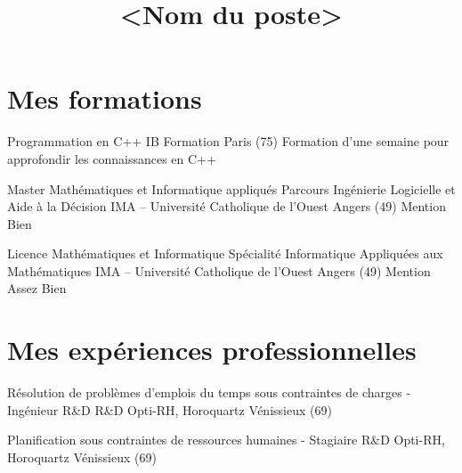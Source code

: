 \documentclass[french]{cvandletter}
\title{<Nom du poste>}
\begin{document}
	\makelettertitle




	\makelettercontents

	\clearpage
	
	\makecvtitle

	\section{Mes formations}
		{Programmation en C++}
		{IB Formation}
		{Paris (75)}
		{}
		{Formation d'une semaine pour approfondir les connaissances en C++}
		
		{Master Mathématiques et Informatique appliqués Parcours Ingénierie Logicielle et Aide à la Décision}
		{IMA – Université Catholique de l'Ouest}
		{Angers (49)}
		{Mention Bien}
		{}

		{Licence Mathématiques et Informatique Spécialité Informatique Appliquées aux Mathématiques}
		{IMA – Université Catholique de l'Ouest}
		{Angers (49)}
		{Mention Assez Bien}
		{}



	\section{Mes expériences professionnelles}
		{Résolution de problèmes d'emplois du temps sous contraintes de charges - Ingénieur R\&D}
		{R\&D Opti-RH, Horoquartz}
		{Vénissieux (69)}
		{}
		{}
		
		
		{Planification sous contraintes de ressources humaines - Stagiaire}
		{R\&D Opti-RH, Horoquartz}
		{Vénissieux (69)}
		{}
		{}
\end{document}
